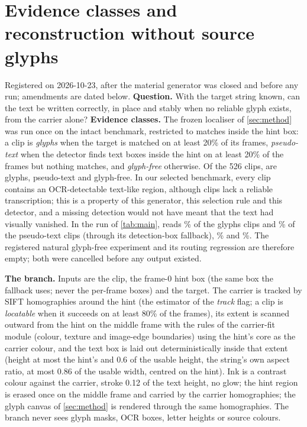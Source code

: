 \section{Evidence classes and reconstruction without source glyphs}
\label{sec:supp_l3}
Registered on 2026-10-23, after the material generator was closed and before any run; amendments are dated below. \textbf{Question.} With the target string known, can the text be written correctly, in place and stably when no reliable glyph exists, from the carrier alone? \textbf{Evidence classes.} The frozen localiser of \cref{sec:method} was run once on the intact benchmark, restricted to matches inside the hint box: a clip is \emph{glyphs} when the target is matched on at least 20\% of its frames, \emph{pseudo-text} when the detector finds text boxes inside the hint on at least 20\% of the frames but nothing matches, and \emph{glyph-free} otherwise. Of the 526 clips, \lthreeGlyphs{} are glyphs, \lthreeLtwo{} pseudo-text and \lthreeLthree{} glyph-free. In our selected benchmark, every clip contains an OCR-detectable text-like region, although \lthreeLtwo{} clips lack a reliable transcription; this is a property of this generator, this selection rule and this detector, and a missing detection would not have meant that the text had visually vanished. In the run of \cref{tab:main}, \method reads \lthreeGlyphsBoneRead\% of the glyphs clips and \lthreeLtwoBoneRead\% of the pseudo-text clips (through its detection-box fallback), \steer \lthreeGlyphsSteerRead\% and \lthreeLtwoSteerRead\%. The registered natural glyph-free experiment and its routing regression are therefore empty; both were cancelled before any output existed.

\textbf{The branch.} Inputs are the clip, the frame-0 hint box (the same box the fallback uses; never the per-frame boxes) and the target. The carrier is tracked by SIFT homographies around the hint (the estimator of the \emph{track} flag; a clip is \emph{locatable} when it succeeds on at least 80\% of the frames), its extent is scanned outward from the hint on the middle frame with the rules of the carrier-fit module (colour, texture and image-edge boundaries) using the hint's core as the carrier colour, and the text box is laid out deterministically inside that extent (height at most the hint's and 0.6 of the usable height, the string's own aspect ratio, at most 0.86 of the usable width, centred on the hint). Ink is a contrast colour against the carrier, stroke 0.12 of the text height, no glow; the hint region is erased once on the middle frame and carried by the carrier homographies; the glyph canvas of \cref{sec:method} is rendered through the same homographies. The branch never sees glyph masks, OCR boxes, letter heights or source colours.

